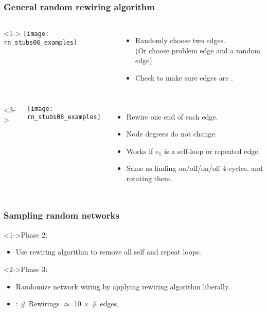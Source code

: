 \begin{frame}[label=]
  \frametitle{General random rewiring algorithm}

  \begin{columns}<1->
    \texttt{[image: rn\_stubs06\_examples]}
    \begin{itemize}
    \item<1-> Randomly choose \alert{two edges}.\\
      (Or choose problem edge and a random edge)
    \item<2-> Check to make sure edges are .
    \end{itemize}
  \end{columns}
  \begin{columns}<3->
    \begin{overprint}
      \texttt{[image: rn\_stubs08\_examples]}
    \end{overprint}
    \begin{itemize}
    \item<3-> Rewire one end of each edge.
    \item<4-> Node degrees \alert{do not change}.
    \item<5-> Works if $e_1$ is a self-loop or repeated edge.
    \item<6-> Same as finding on/off/on/off 4-cycles.
      and rotating them.
    \end{itemize}
  \end{columns}
  
\end{frame}

\begin{frame}[label=]
  \frametitle{Sampling random networks}

  \begin{block}<1->{Phase 2:}
    \begin{itemize}
    \item<1-> Use rewiring algorithm to remove
      all self and repeat loops.
    \end{itemize}
  \end{block}  

  \begin{block}<2->{Phase 3:}
    \begin{itemize}
    \item<2-> \alert{Randomize network} wiring by applying
      rewiring algorithm liberally.
    \item<3-> :
      \# Rewirings $\simeq$
      10 $\times$ \# edges\cite{milo2003a}.
    \end{itemize}
  \end{block}  
  
\end{frame}

